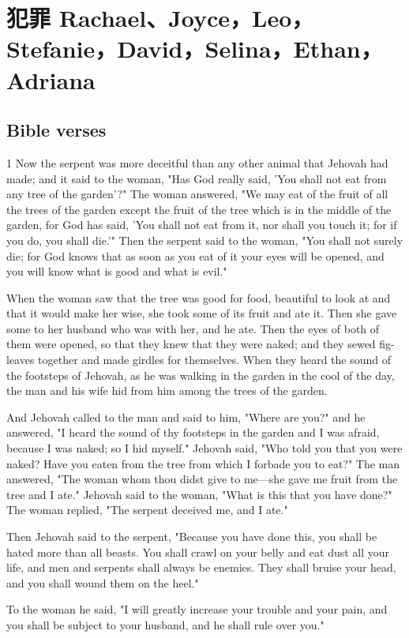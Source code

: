 \chapter{犯罪 Rachael、Joyce，Leo，Stefanie，David，Selina，Ethan，Adriana}
\iffalse
\section{Bible verses}
1 Now the serpent was more deceitful than any other animal that Jehovah had made; and it said to the woman, "Has God really said, 'You shall not eat from any tree of the garden'?" The woman answered, "We may eat of the fruit of all the trees of the garden except the fruit of the tree which is in the middle of the garden, for God has said, 'You shall not eat from it, nor shall you touch it; for if you do, you shall die.'" Then the serpent said to the woman, "You shall not surely die; for God knows that as soon as you eat of it your eyes will be opened, and you will know what is good and what is evil."


When the woman saw that the tree was good for food, beautiful to look at and that it would make her wise, she took some of its fruit and ate it. Then she gave some to her husband who was with her, and he ate.
Then the eyes of both of them were opened, so that they knew that they were naked; and they sewed fig-leaves together and made girdles for themselves. When they heard the sound of the footsteps of Jehovah, as he was walking in the garden in the cool of the day, the man and his wife hid from him among the trees of the garden.

And Jehovah called to the man and said to him, "Where are you?" and he answered, "I heard the sound of thy footsteps in the garden and I was afraid, because I was naked; so I hid myself." Jehovah said, "Who told you that you were naked? Have you eaten from the tree from which I forbade you to eat?" The man answered, "The woman whom thou didst give to me—she gave me fruit from the tree and I ate." Jehovah said to the woman, "What is this that you have done?" The woman replied, "The serpent deceived me, and I ate."

Then Jehovah said to the serpent, "Because you have done this, you shall be hated more than all beasts. You shall crawl on your belly and eat dust all your life, and men and serpents shall always be enemies. They shall bruise your head, and you shall wound them on the heel."

To the woman he said, "I will greatly increase your trouble and your pain, and you shall be subject to your husband, and he shall rule over you."

